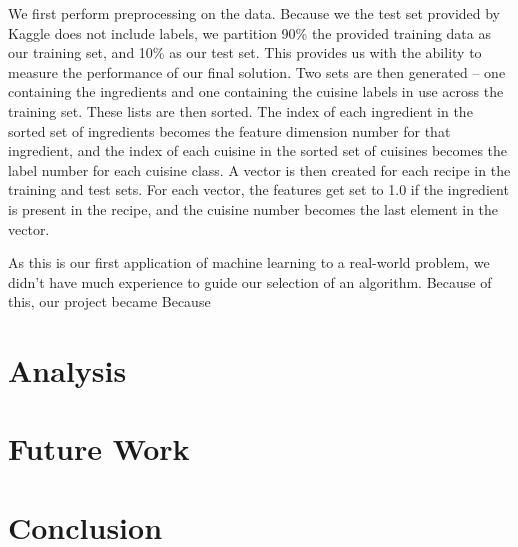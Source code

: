 \documentclass[11pt]{article}
\begin{document}
We first perform preprocessing on the data.  Because we the test set
provided by Kaggle does not include labels, we partition 90\% the
provided training data as our training set, and 10\% as our test set.
This provides us with the ability to measure the performance of our
final solution.  Two sets are then generated -- one containing the
ingredients and one containing the cuisine labels in use across the
training set.  These lists are then sorted.  The index of each
ingredient in the sorted set of ingredients becomes the feature
dimension number for that ingredient, and the index of each cuisine in
the sorted set of cuisines becomes the label number for each cuisine
class.  A vector is then created for each recipe in the training and
test sets.  For each vector, the features get set to 1.0 if the
ingredient is present in the recipe, and the cuisine number becomes
the last element in the vector.

As this is our first application of machine learning to a real-world
problem, we didn't have much experience to guide our selection of an
algorithm.  Because of this, our project became 
Because 





\section{Analysis}


\section{Future Work}


\section{Conclusion}





\end{document}

